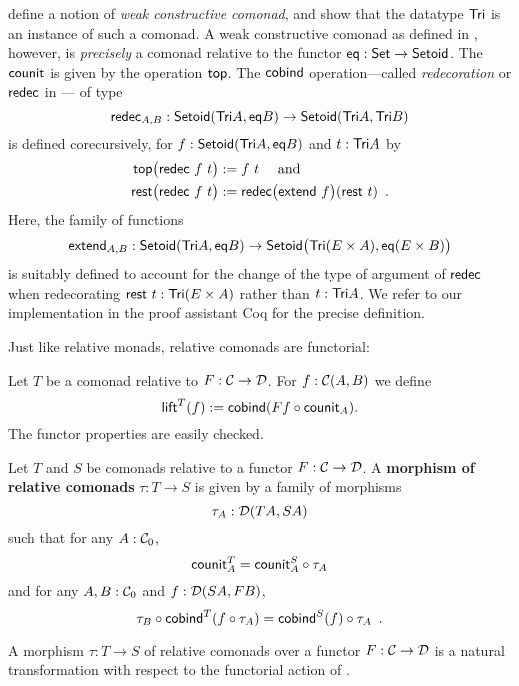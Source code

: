 \documentclass{amsart}
\newcommand{\fat}[1]{\textbf{#1}}
\begin{document}
\begin{example}
\noindent
\textcite{DBLP:conf/types/MatthesP11} define a notion of \emph{weak constructive comonad}, and show that the datatype $\Tri$
  is an instance of such a comonad. 
  A weak constructive comonad as defined in \parencite{DBLP:conf/types/MatthesP11}, however, is \emph{precisely}
  a comonad relative to the functor $\eq : \Set\to\Setoid$.
  The $\counit$ is given by the operation $\head$.
  The $\cobind$ operation---called \emph{redecoration} or $\redec$ in \parencite{DBLP:conf/types/MatthesP11}--- of type
   \[ \redec_{A,B} : \Setoid(\Tri A,\eq B) \to \Setoid(\Tri A,\Tri B )\] is defined 
  corecursively, for $f:\Setoid(\Tri A,\eq B)$  and $t : \Tri A$ by
      \begin{align*}\head\bigl(\redec~f~t\bigr) &:= f~t \quad\text{ and } \\
                     \tail\bigl(\redec~f~t\bigr) &:= \redec\bigl(\extend~f\bigr)(\tail~t) \enspace . 
      \end{align*}
Here, the family of functions 
     \[\extend_{A,B} : \Setoid(\Tri A,\eq B) \to \Setoid\bigr(\Tri (E \times A),\eq(E\times B)\bigr)\]
  is suitably defined to account for the change of the type of argument of $\redec$ when redecorating $\tail~t : \Tri(E\times A)$
  rather than $t : \Tri A$. We refer to our implementation in the proof assistant \textsf{Coq} for the precise definition.
\end{example}


Just like relative monads, relative comonads are functorial:
\begin{definition}\label{def:lift}
 Let $T$ be a  comonad relative to $F:\C\to\D$.
 For $f : \C(A,B)$ we define
  \[ \lift^T(f) := \cobind(\comp{\counit_A}{Ff}) .  \]
 The functor properties are easily checked.
\end{definition}



\begin{definition}
 Let $T$ and $S$ be comonads relative to a functor $F : \C \to \D$. A \fat{morphism of relative comonads} $\tau : T \to S$
  is given by a family of morphisms \[\tau_A : \D(TA,SA)\] such that for any $A : \C_0$,
     \[  \counit^T_A = \comp{\tau_A}{\counit^S_A} \]
   and for any $A,B : \C_0$ and $f : \D(SA,FB)$,
   \[  \comp{\cobind^T(\comp{\tau_A}{f})}{\tau_B} = \comp{\tau_A}{\cobind^S(f)} \enspace .  \]
\end{definition}

A morphism $\tau : T\to S$ of relative comonads over a functor $F:\C\to\D$ is a natural transformation
with respect to the functorial action of .
\end{document}
